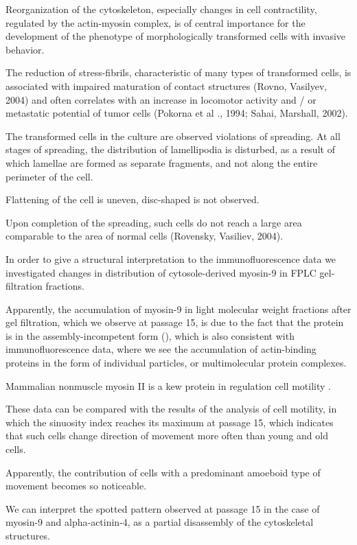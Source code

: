 \documentclass[english,authoryear]{elsarticle}
\begin{document}
Reorganization of the cytoskeleton, especially changes in cell contractility, regulated by the actin-myosin complex, is of central importance for the development of the phenotype of morphologically transformed cells with invasive behavior.

The reduction of stress-fibrils, characteristic of many types of transformed cells, is associated with impaired maturation of contact structures (Rovno, Vasilyev, 2004) and often correlates with an increase in locomotor activity and / or metastatic potential of tumor cells (Pokorna et al ., 1994; Sahai, Marshall, 2002).

The transformed cells in the culture are observed violations of spreading.
At all stages of spreading, the distribution of lamellipodia is disturbed, as a result of which lamellae are formed as separate fragments, and not along the entire perimeter of the cell.

Flattening of the cell is uneven, disc-shaped is not observed.

Upon completion of the spreading, such cells do not reach a large area comparable to the area of normal cells (Rovensky, Vasiliev, 2004).

In order to give a structural interpretation to the immunofluorescence data we investigated changes in distribution of cytosole-derived myosin-9 in FPLC gel-filtration fractions.

Apparently, the accumulation of myosin-9 in light molecular weight fractions after gel filtration, which we observe at passage 15, is due to the fact that the protein is in the assembly-incompetent form (\cite{vicente2009non}), which is also consistent with immunofluorescence data, where we see the accumulation of actin-binding proteins in the form of individual particles, or multimolecular protein complexes.

Mammalian nonmuscle myosin II is a kew protein in regulation cell motility \cite{shutova2018mammalian}.

These data can be compared with the results of the analysis of cell motility, in which the sinuosity index reaches its maximum at passage 15, which indicates that such cells change direction of movement more often than young and old cells.

Apparently, the contribution of cells with a predominant amoeboid type of movement becomes so noticeable.

We can interpret the spotted pattern observed at passage 15 in the case of myosin-9 and alpha-actinin-4, as a partial disassembly of the cytoskeletal structures.
\end{document}
